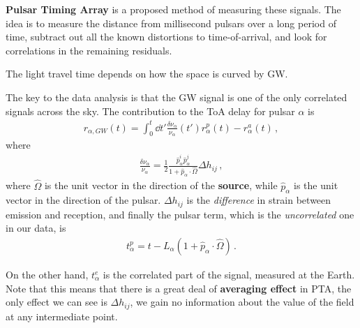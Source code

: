 \documentclass[main.tex]{subfiles}
\begin{document}
\textbf{Pulsar Timing Array} is a proposed method of measuring these signals. 
The idea is to measure the distance from millisecond pulsars over a long period of time, subtract out all the known distortions to time-of-arrival, and look for correlations in the remaining residuals.

The light travel time depends on how the space is curved by GW. 

The key to the data analysis is that the GW signal is one of the only correlated signals across the sky. The contribution to the ToA delay for pulsar \(\alpha \) is 
%
\begin{align}
r_{\alpha , GW} (t) = \int_{0}^{t} \dd{t'} \frac{ \delta \nu _\alpha }{\nu _\alpha } (t')
r_{\alpha }^{p} (t) - r^{a}_{\alpha } (t)
\,,
\end{align}
%
where 
%
\begin{align}
\frac{ \delta \nu_{\alpha }}{\nu_{\alpha }} = \frac{1}{2} \frac{\hat{p}^{i}_{\alpha } \hat{p}^{j}_{\alpha }}{1 + \hat{p}_{\alpha } \cdot \hat{\Omega}} \Delta h_{ij}
\,,
\end{align}
%
where \(\hat{\Omega}\) is the unit vector in the direction of the \textbf{source}, while \(\hat{p}_{\alpha }\) is the unit vector in the direction of the pulsar. \(\Delta h_{ij} \) is the \emph{difference} in strain between emission and reception, and finally the pulsar term, which is the \emph{uncorrelated} one in our data, is
%
\begin{align}
t^{p}_{\alpha } = t - L_\alpha (1 + \hat{p}_{\alpha } \cdot \hat{\Omega})
\,.
\end{align}

On the other hand, \(t^{e}_{\alpha }\) is the correlated part of the signal, measured at the Earth. 
Note that this means that there is a great deal of \textbf{averaging effect} in PTA, the only effect we can see is \(\Delta h_{ij}\), we gain no information about the value of the field at any intermediate point. 


\end{document}
